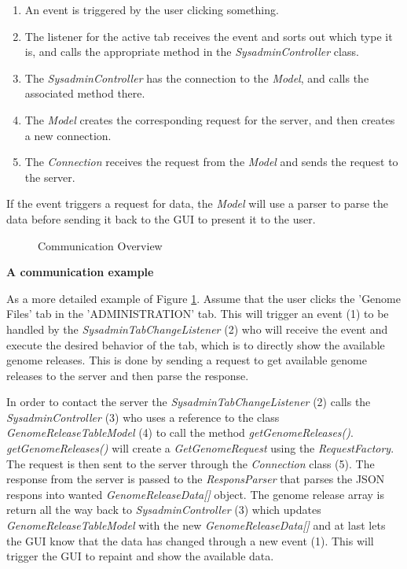 \begin{enumerate}

  \item An event is triggered by the user clicking something.
  \item The listener for the active tab receives the event and sorts out which type it is, and calls the appropriate method in the \textit{SysadminController} class.
  \item The \textit{SysadminController} has the connection to the \textit{Model}, and calls the associated method there.
  \item The \textit{Model} creates the corresponding request for the server, and then creates a new connection.
  \item The \textit{Connection} receives the request from the \textit{Model} and sends the request to the server.


\end{enumerate}

If the event triggers a request for data, the \textit{Model} will use a parser to parse the data before sending it back to the GUI to present it to the user.


\begin{figure}[hbt!]
\caption{Communication Overview}
\label{fig:adm_com_view}
\end{figure}

\textbf{A communication example}

As a more detailed example of Figure \ref{fig:adm_com_view}. Assume that the user clicks the 'Genome Files' tab in the 'ADMINISTRATION' tab. This will trigger an event (1) to be handled by the \textit{SysadminTabChangeListener} (2) who will receive the event and execute the desired behavior of the tab, which is to directly show the available genome releases. This is done by sending a request to get available genome releases to the server and then parse the response. 

In order to contact the server the \textit{SysadminTabChangeListener} (2) calls the \textit{SysadminController} (3) who uses a reference to the class \textit{GenomeReleaseTableModel} (4) to call the method \textit{getGenomeReleases()}. \textit{getGenomeReleases()} will create a \textit{GetGenomeRequest} using the \textit{RequestFactory}. The request is then sent to the server through the \textit{Connection} class (5). The response from the server is passed to the \textit{ResponsParser} that parses the JSON respons into wanted \textit{GenomeReleaseData[]} object. The genome release array is return all the way back to \textit{SysadminController} (3) which updates \textit{GenomeReleaseTableModel} with the new \textit{GenomeReleaseData[]} and at last lets the GUI know that the data has changed through a new event (1). This will trigger the GUI to repaint and show the available data.

